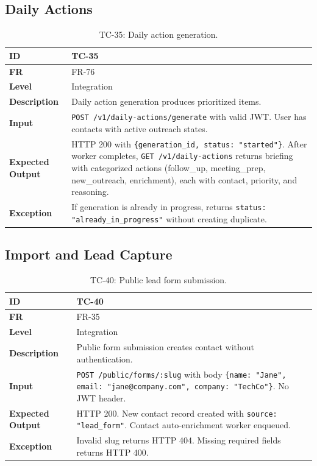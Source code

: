 \documentclass[a4paper]{article}
\begin{document}
\subsection{Daily Actions}

\begin{table}[H]
\centering
\caption{TC-35: Daily action generation.}
\small
\begin{tabular}{|p{3cm}|p{10.5cm}|}
\hline
\textbf{ID} & TC-35 \\
\hline
\textbf{FR} & FR-76 \\
\hline
\textbf{Level} & Integration \\
\hline
\textbf{Description} & Daily action generation produces prioritized items. \\
\hline
\textbf{Input} & \texttt{POST /v1/daily-actions/generate} with valid JWT. User has contacts with active outreach states. \\
\hline
\textbf{Expected Output} & HTTP 200 with \texttt{\{generation\_id, status: "started"\}}. After worker completes, \texttt{GET /v1/daily-actions} returns briefing with categorized actions (follow\_up, meeting\_prep, new\_outreach, enrichment), each with contact, priority, and reasoning. \\
\hline
\textbf{Exception} & If generation is already in progress, returns \texttt{status: "already\_in\_progress"} without creating duplicate. \\
\hline
\end{tabular}
\end{table}

\subsection{Import and Lead Capture}

\begin{table}[H]
\centering
\caption{TC-40: Public lead form submission.}
\small
\begin{tabular}{|p{3cm}|p{10.5cm}|}
\hline
\textbf{ID} & TC-40 \\
\hline
\textbf{FR} & FR-35 \\
\hline
\textbf{Level} & Integration \\
\hline
\textbf{Description} & Public form submission creates contact without authentication. \\
\hline
\textbf{Input} & \texttt{POST /public/forms/:slug} with body \texttt{\{name: "Jane", email: "jane@company.com", company: "TechCo"\}}. No JWT header. \\
\hline
\textbf{Expected Output} & HTTP 200. New contact record created with \texttt{source: "lead\_form"}. Contact auto-enrichment worker enqueued. \\
\hline
\textbf{Exception} & Invalid slug returns HTTP 404. Missing required fields returns HTTP 400. \\
\hline
\end{tabular}
\end{table}
\end{document}
